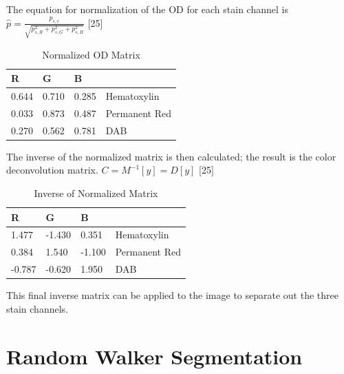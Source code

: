\documentclass[12pt]{article}
\begin{document}
\noindent The equation for normalization of the OD for each stain channel is \begin{math}\hat{p} = \frac{p_{s,c}}{\sqrt{p_{s,R}^2 + p_{s,G}^2 + p_{s,B}^2}}\end{math} [25]


\begin{table}[H]
\centering
\caption{Normalized OD Matrix}
\label{Normalized OD}
\begin{tabular}{|l|l|l|l}
\cline{1-3}
R   & G   & B   &                                    \\ \hline
0.644 & 0.710 & 0.285 & \multicolumn{1}{l|}{Hematoxylin}   \\ \hline
0.033 & 0.873  & 0.487  & \multicolumn{1}{l|}{Permanent Red} \\ \hline
0.270 & 0.562 & 0.781 & \multicolumn{1}{l|}{DAB}           \\ \hline
\end{tabular}
\end{table}

\noindent The inverse of the normalized matrix is then calculated; the result is the color deconvolution matrix. \begin{math}C = M^{-1}[y] = D[y]\end{math} [25]


\begin{table}[H]
\centering
\caption{Inverse of Normalized Matrix}
\label{Inverse Normalized}
\begin{tabular}{|l|l|l|l}
\cline{1-3}
R   & G   & B   &                                    \\ \hline
1.477 & -1.430 & 0.351 & \multicolumn{1}{l|}{Hematoxylin}   \\ \hline
0.384 & 1.540  & -1.100  & \multicolumn{1}{l|}{Permanent Red} \\ \hline
-0.787 & -0.620 & 1.950 & \multicolumn{1}{l|}{DAB}           \\ \hline
\end{tabular}
\end{table}

\noindent This final inverse matrix can be applied to the image to separate out the three stain channels.

\section*{Random Walker Segmentation}
\end{document}
